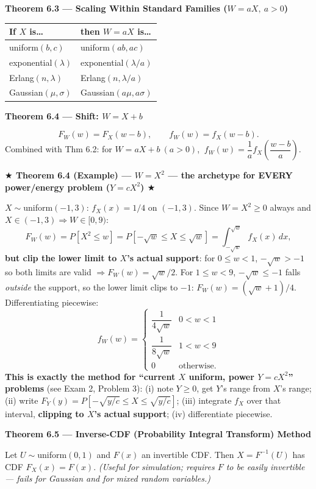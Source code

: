 \documentclass[11pt]{article}
\renewcommand{\P}[1]{P\left[#1\right]}
\newcommand{\topline}[1]{\par\vspace{5pt}\noindent{\color{#1}\rule{\linewidth}{1.1pt}}\par\vspace{3pt}}
\newcommand{\botline}[1]{\par\vspace{2pt}\noindent{\color{#1}\rule{\linewidth}{1.1pt}}\par\vspace{8pt}}
\newenvironment{thmbox}[2]{%
  \topline{thmcol}\noindent\textbf{\color{thmcol}Theorem #1 --- #2}\par\smallskip\noindent\ignorespaces
}{\botline{thmcol}}
\newenvironment{flagbox}[2]{%
  \topline{flagcol}\vspace{-9pt}\topline{flagcol}%
  \noindent\textbf{\color{flagcol}$\bigstar$ Theorem #1 --- #2 $\bigstar$ \; [PROFESSOR-FLAGGED --- MEMORIZE]}\par\smallskip\noindent\ignorespaces
}{\botline{flagcol}\vspace{-9pt}\botline{flagcol}}
\begin{document}
\begin{thmbox}{6.3}{Scaling Within Standard Families ($W=aX,\ a>0$)}
\begin{center}
\begin{tabular}{@{}ll@{}}
\toprule
If $X$ is\dots & then $W=aX$ is\dots\\
\midrule
uniform$(b,c)$ & uniform$(ab,ac)$\\
exponential$(\lambda)$ & exponential$(\lambda/a)$\\
Erlang$(n,\lambda)$ & Erlang$(n,\lambda/a)$\\
Gaussian$(\mu,\sigma)$ & Gaussian$(a\mu,a\sigma)$\\
\bottomrule
\end{tabular}
\end{center}
\end{thmbox}

\begin{thmbox}{6.4}{Shift: $W=X+b$}
\[ F_W(w)=F_X(w-b), \qquad f_W(w)=f_X(w-b). \]
Combined with Thm 6.2: for $W=aX+b\ (a>0)$, $\ f_W(w)=\dfrac1a f_X\!\left(\dfrac{w-b}{a}\right)$.
\end{thmbox}

\begin{flagbox}{6.4 (Example)}{$W=X^2$ --- the archetype for EVERY power/energy problem ($Y=cX^2$)}
$X\sim$uniform$(-1,3)$: $f_X(x)=1/4$ on $(-1,3)$. Since $W=X^2\ge0$ always and
$X\in(-1,3)\Rightarrow W\in[0,9)$:
\[
F_W(w)=\P{X^2\le w}=\P{-\sqrt w\le X\le\sqrt w} = \int_{-\sqrt w}^{\sqrt w} f_X(x)\,dx,
\]
\textbf{but clip the lower limit to $X$'s actual support}: for $0\le w<1$, $-\sqrt w>-1$ so
both limits are valid $\Rightarrow F_W(w)=\sqrt w/2$. For $1\le w<9$, $-\sqrt w\le -1$ falls
\emph{outside} the support, so the lower limit clips to $-1$: $F_W(w)=(\sqrt w+1)/4$.
Differentiating piecewise:
\[
f_W(w) = \begin{cases} \dfrac{1}{4\sqrt w} & 0<w<1\\[6pt] \dfrac{1}{8\sqrt w} & 1<w<9\\[4pt] 0 & \text{otherwise.}\end{cases}
\]
\textbf{This is exactly the method for ``current $X$ uniform, power $Y=cX^2$'' problems}
(see Exam 2, Problem 3): (i) note $Y\ge0$, get $Y$'s range from $X$'s range; (ii) write
$F_Y(y)=\P{-\sqrt{y/c}\le X\le\sqrt{y/c}}$; (iii) integrate $f_X$ over that interval,
\textbf{clipping to $X$'s actual support}; (iv) differentiate piecewise.
\end{flagbox}

\begin{thmbox}{6.5}{Inverse-CDF (Probability Integral Transform) Method}
Let $U\sim$uniform$(0,1)$ and $F(x)$ an invertible CDF. Then $X=F^{-1}(U)$ has CDF $F_X(x)=F(x)$.
\emph{(Useful for simulation; requires $F$ to be easily invertible --- fails for Gaussian and
for mixed random variables.)}
\end{thmbox}
\end{document}

